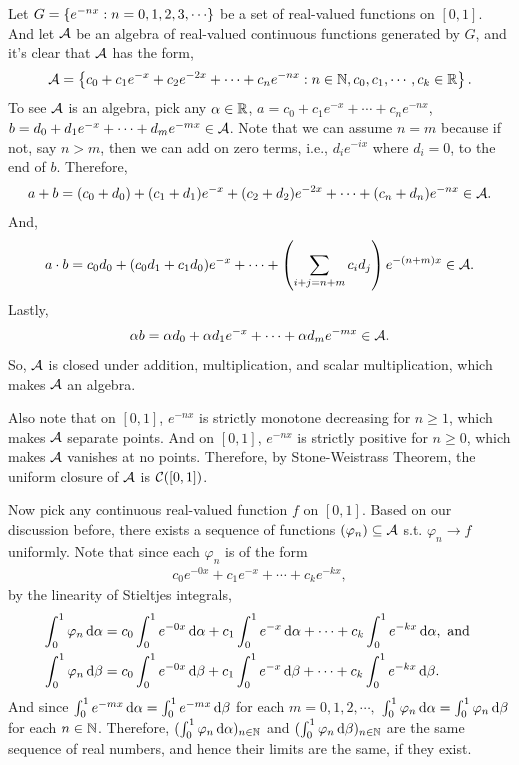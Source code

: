 \documentclass[12pt]{article}
\begin{document}
\begin{fproof}[3(a)]
Let  \(G = \set{e^{-nx}:n = 0,1,2,3,\cdots}\) be a set of real-valued functions on \([0,1]\).
And let \(\mathcal{A}\) be an algebra of real-valued continuous functions generated by \(G\), and it's clear that \(\mathcal{A}\) has the form,
\begin{align*}
    \mathcal{A} = \left\{ c_0 + c_1e^{-x}+ c_2e^{-2x} + \cdots + c_ne^{-nx}: n \in \mathbb {N}, c_0, c_1, \cdots, c_k \in \mathbb {R} \right\}.
\end{align*}
To see \(\mathcal{A}\) is an algebra, pick any \(\alpha \in \mathbb {R}\), \(a=c_0 + c_1e^{-x} + \cdots + c_ne^{-nx}\), \(b=d_0 + d_1e^{-x}+ \cdots + d_me^{-mx} \in \mathcal{A}\).
Note that we can assume \(n = m\) because if not, say \(n > m\), then we can add on zero terms, i.e., \(d_ie^{-ix}\) where \(d_i = 0\), to the end of \(b\).
Therefore,
\begin{align*}
    a+b = (c_0 + d_0) + (c_1+d_1)e^{-x} + (c_2+d_2)e^{-2x} + \cdots + (c_n + d_n)e^{-nx} \in \mathcal{A}.
\end{align*}
And,
\begin{align*}
    a \cdot b = c_0d_0 + (c_0d_1 + c_1d_0)e^{-x} + \cdots + \left( \sum_{i+j = n+m}c_id_j \right)e^{-(n+m)x} \in \mathcal{A}.
\end{align*}
Lastly,
\begin{align*}
    \alpha b = \alpha d_0 + \alpha d_1 e^{-x} + \cdots + \alpha d_m e^{-mx} \in \mathcal{A}.
\end{align*}
So, \(\mathcal{A}\) is closed under addition, multiplication, and scalar multiplication, which makes \(\mathcal{A}\) an algebra.

Also note that on \([0,1]\), \(e^{-nx}\) is strictly monotone decreasing for \(n \geq 1\), which makes \(\mathcal{A}\) separate points. And on \([0,1]\), \(e^{-nx}\) is strictly positive for \(n \geq 0\), which makes \(\mathcal{A}\) vanishes at no points.
Therefore, by Stone-Weistrass Theorem, the uniform closure of \(\mathcal{A}\) is \(\mathcal{C}([0,1])\).

Now pick any continuous real-valued function \(f\) on \([0,1]\).
Based on our discussion before, there exists a sequence of functions \((\varphi_n) \subseteq \mathcal{A}\) s.t. \(\varphi_n \to f\) uniformly.
Note that since each \(\varphi_n\) is of the form 
\begin{align*}
    c_0e^{-0x} + c_1e^{-x} + \cdots + c_ke^{-kx},
\end{align*}
by the linearity of Stieltjes integrals,
\begin{align*}
    \int_{0}^{1} \varphi_n \dalf &= c_0\int_{0}^{1} e^{-0x} \dalf + c_1 \int_{0}^{1} e^{-x} \dalf + \cdots + c_k \int_{0}^{1}e^{-kx} \dalf, \text{ and }\\
    \int_{0}^{1} \varphi_n \dbet & = c_0\int_{0}^{1} e^{-0x} \dbet + c_1 \int_{0}^{1} e^{-x} \dbet + \cdots + c_k \int_{0}^{1}e^{-kx} \dbet.
\end{align*}
And since \(\int_{0}^{1} e^{-mx} \mathop{}\!\mathrm{d}\alpha = \int_{0}^{1} e^{-mx} \mathop{}\!\mathrm{d}\beta\) for each \(m = 0, 1, 2, \cdots,\) \(\int_{0}^{1} \varphi_n \mathop{}\!\mathrm{d}\alpha = \int_{0}^{1} \varphi_n \mathop{}\!\mathrm{d}\beta\) for each \(n \in \mathbb {N}\).
Therefore, \((\int_{0}^{1}\varphi_n \mathop{}\!\mathrm{d}\alpha)_{n \in \mathbb {N}}\) and \((\int_{0}^{1} \varphi_n \mathop{}\!\mathrm{d}\beta)_{n \in \mathbb {N}}\) are the same sequence of real numbers, and hence their limits are the same, if they exist.


\end{fproof}
\end{document}
